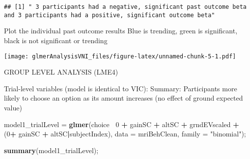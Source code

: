 \documentclass[]{article}
\newenvironment{Shaded}{\begin{snugshade}}{\end{snugshade}}
\newcommand{\CommentTok}[1]{\textcolor[rgb]{0.56,0.35,0.01}{\textit{#1}}}
\newcommand{\DataTypeTok}[1]{\textcolor[rgb]{0.13,0.29,0.53}{#1}}
\newcommand{\DecValTok}[1]{\textcolor[rgb]{0.00,0.00,0.81}{#1}}
\newcommand{\FloatTok}[1]{\textcolor[rgb]{0.00,0.00,0.81}{#1}}
\newcommand{\KeywordTok}[1]{\textcolor[rgb]{0.13,0.29,0.53}{\textbf{#1}}}
\newcommand{\NormalTok}[1]{#1}
\newcommand{\OperatorTok}[1]{\textcolor[rgb]{0.81,0.36,0.00}{\textbf{#1}}}
\newcommand{\StringTok}[1]{\textcolor[rgb]{0.31,0.60,0.02}{#1}}
\begin{document}
\begin{verbatim}
## [1] " 3 participants had a negative, significant past outcome beta and 3 participants had a positive, significant outcome beta"
\end{verbatim}

Plot the individual past outcome results Blue is trending, green is
significant, black is not significant or trending

\begin{Shaded}
\end{Shaded}

\texttt{[image: glmerAnalysisVNI\_files/figure-latex/unnamed-chunk-5-1.pdf]}

GROUP LEVEL ANALYSIS (LME4)

Trial-level variables (model is identical to VIC): Summary: Participants
more likely to choose an option as its amount increases (no effect of
ground expected value)

\begin{Shaded}
\begin{Highlighting}[]
\NormalTok{model1_trialLevel =}\StringTok{ }\KeywordTok{glmer}\NormalTok{(choice}\OperatorTok{~}\StringTok{ }\DecValTok{0} \OperatorTok{+}\StringTok{ }\NormalTok{gainSC }\OperatorTok{+}\StringTok{ }\NormalTok{altSC }\OperatorTok{+}\StringTok{ }\NormalTok{grndEVscaled }\OperatorTok{+}\StringTok{ }\NormalTok{(}\DecValTok{0}\OperatorTok{+}\StringTok{ }\NormalTok{gainSC }\OperatorTok{+}\StringTok{ }\NormalTok{altSC}\OperatorTok{|}\NormalTok{subjectIndex), }\DataTypeTok{data =}\NormalTok{ mriBehClean, }\DataTypeTok{family =} \StringTok{"binomial"}\NormalTok{);}

\KeywordTok{summary}\NormalTok{(model1_trialLevel);}
\end{Highlighting}
\end{Shaded}
\end{document}
